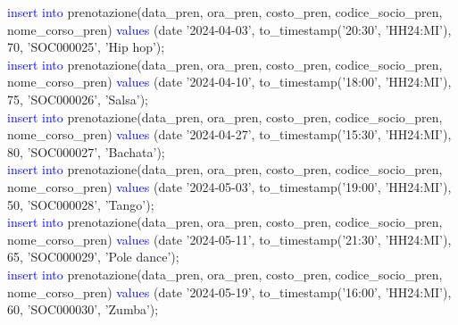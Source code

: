 \documentclass{article}
\begin{document}
\begin{flushleft}
{        \vspace{2mm}
        \hspace*{0.5em}\textcolor{blue}{insert into} prenotazione(data\_pren, ora\_pren, costo\_pren, codice\_socio\_pren, \hspace*{0.5em}nome\_corso\_pren) \textcolor{blue}{values} (date '2024-04-03', to\_timestamp('20:30', 'HH24:MI'), 70, \hspace*{0.5em}'SOC000025', 'Hip hop'); \\
        \vspace{2mm}
        \hspace*{0.5em}\textcolor{blue}{insert into} prenotazione(data\_pren, ora\_pren, costo\_pren, codice\_socio\_pren, \hspace*{0.5em}nome\_corso\_pren) \textcolor{blue}{values} (date '2024-04-10', to\_timestamp('18:00', 'HH24:MI'), 75, \hspace*{0.5em}'SOC000026', 'Salsa'); \\
        \vspace{2mm}
        \hspace*{0.5em}\textcolor{blue}{insert into} prenotazione(data\_pren, ora\_pren, costo\_pren, codice\_socio\_pren, \hspace*{0.5em}nome\_corso\_pren) \textcolor{blue}{values} (date '2024-04-27', to\_timestamp('15:30', 'HH24:MI'), 80, \hspace*{0.5em}'SOC000027', 'Bachata'); \\
        \vspace{2mm}
        \hspace*{0.5em}\textcolor{blue}{insert into} prenotazione(data\_pren, ora\_pren, costo\_pren, codice\_socio\_pren, \hspace*{0.5em}nome\_corso\_pren) \textcolor{blue}{values} (date '2024-05-03', to\_timestamp('19:00', 'HH24:MI'), 50, \hspace*{0.5em}'SOC000028', 'Tango'); \\
        \vspace{2mm}
        \hspace*{0.5em}\textcolor{blue}{insert into} prenotazione(data\_pren, ora\_pren, costo\_pren, codice\_socio\_pren, \hspace*{0.5em}nome\_corso\_pren) \textcolor{blue}{values} (date '2024-05-11', to\_timestamp('21:30', 'HH24:MI'), 65, \hspace*{0.5em}'SOC000029', 'Pole dance'); \\
        \vspace{2mm}
        \hspace*{0.5em}\textcolor{blue}{insert into} prenotazione(data\_pren, ora\_pren, costo\_pren, codice\_socio\_pren, \hspace*{0.5em}nome\_corso\_pren) \textcolor{blue}{values} (date '2024-05-19', to\_timestamp('16:00', 'HH24:MI'), 60, \hspace*{0.5em}'SOC000030', 'Zumba'); \\
}
\end{flushleft}
\end{document}
